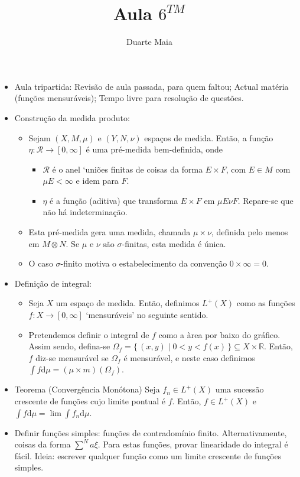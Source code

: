 \documentclass{article}
\title{Aula $6^{TM}$}
\author{Duarte Maia}
\date{}
\newcommand{\R}{\mathbb{R}}
\newcommand{\dd}{\mathrm{d}}
\begin{document}
\maketitle

\begin{itemize}
\item Aula tripartida: Revisão de aula passada, para quem faltou; Actual matéria (funções mensuráveis); Tempo livre para resolução de questões.
\item Construção da medida produto:
\begin{itemize}
\item Sejam $(X,M,\mu)$ e $(Y,N,\nu)$ espaços de medida. Então, a função $\eta : \mathcal R \to [0,\infty]$ é uma pré-medida bem-definida, onde
\begin{itemize}
\item $\mathcal R$ é o anel `uniões finitas de coisas da forma $E \times F$, com $E \in M$ com $\mu E < \infty$ e idem para $F$.
\item $\eta$ é a função (aditiva) que transforma $E \times F$ em $\mu E \nu F$. Repare-se que não há indeterminação.
\end{itemize}
\item Esta pré-medida gera uma medida, chamada $\mu \times \nu$, definida pelo menos em $M \otimes N$. Se $\mu$ e $\nu$ são $\sigma$-finitas, esta medida é única.
\item O caso $\sigma$-finito motiva o estabelecimento da convenção $0 \times \infty = 0$.
\end{itemize}
\item Definição de integral:
\begin{itemize}
\item Seja $X$ um espaço de medida. Então, definimos $L^+(X)$ como as funções $f : X \to [0,\infty]$ `mensuráveis' no seguinte sentido.
\item Pretendemos definir o integral de $f$ como a àrea por baixo do gráfico. Assim sendo, defina-se $\Omega_f = \{\,(x,y) \mid 0<y<f(x)\,\} \subseteq X \times \R$. Então, $f$ diz-se mensurável se $\Omega_f$ é mensurável, e neste caso definimos $\int f \dd \mu = (\mu \times m)(\Omega_f)$.
\end{itemize}
\item Teorema (Convergência Monótona) Seja $f_n \in L^+(X)$ uma sucessão crescente de funções cujo limite pontual é $f$. Então, $f \in L^+(X)$ e $\int f \dd \mu = \lim \int f_n \dd \mu$.
\item Definir funções simples: funções de contradomínio finito. Alternativamente, coisas da forma $\sum^N a \xi$. Para estas funções, provar linearidade do integral é fácil. Ideia: escrever qualquer função como um limite crescente de funções simples.

\end{itemize}
\end{document}
